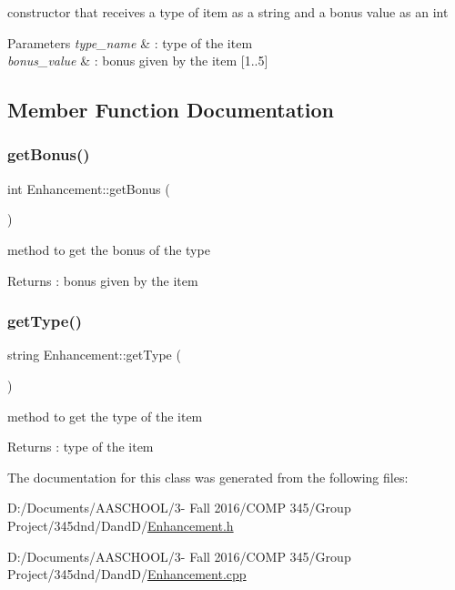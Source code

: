 constructor that receives a type of item as a string and a bonus value as an int 
\begin{DoxyParams}{Parameters}
{\em type\+\_\+name} & \+: type of the item \\
\hline
{\em bonus\+\_\+value} & \+: bonus given by the item \mbox{[}1..5\mbox{]} \\
\hline
\end{DoxyParams}


\subsection{Member Function Documentation}
\hypertarget{class_enhancement_afd0ea7d414468cf507a4673fd066fd89}{}\label{class_enhancement_afd0ea7d414468cf507a4673fd066fd89} 
\subsubsection{\texorpdfstring{get\+Bonus()}{getBonus()}}
{\footnotesize\ttfamily int Enhancement\+::get\+Bonus (\begin{DoxyParamCaption}{ }\end{DoxyParamCaption})}

method to get the bonus of the type \begin{DoxyReturn}{Returns}
\+: bonus given by the item 
\end{DoxyReturn}
\hypertarget{class_enhancement_abcdde9da0542f751301f4ddf1809a1cc}{}\label{class_enhancement_abcdde9da0542f751301f4ddf1809a1cc} 
\subsubsection{\texorpdfstring{get\+Type()}{getType()}}
{\footnotesize\ttfamily string Enhancement\+::get\+Type (\begin{DoxyParamCaption}{ }\end{DoxyParamCaption})}

method to get the type of the item \begin{DoxyReturn}{Returns}
\+: type of the item 
\end{DoxyReturn}


The documentation for this class was generated from the following files\+:\begin{DoxyCompactItemize}
\item 
D\+:/\+Documents/\+A\+A\+S\+C\+H\+O\+O\+L/3-\/ Fall 2016/\+C\+O\+M\+P 345/\+Group Project/345dnd/\+Dand\+D/\hyperlink{_enhancement_8h}{Enhancement.\+h}\item 
D\+:/\+Documents/\+A\+A\+S\+C\+H\+O\+O\+L/3-\/ Fall 2016/\+C\+O\+M\+P 345/\+Group Project/345dnd/\+Dand\+D/\hyperlink{_enhancement_8cpp}{Enhancement.\+cpp}\end{DoxyCompactItemize}

